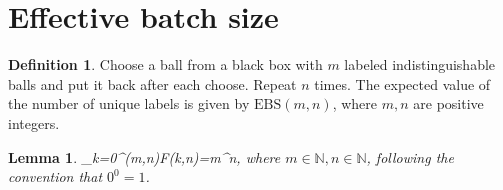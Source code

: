 \documentclass[12pt, letterpaper]{article}
\newcommand{\nat}{\mathbb{N}}
\newcommand{\inte}{\mathbb{Z}}
\newcommand{\red}[1]{{\color{red} #1}}
\newenvironment{eqlong}{\equation\aligned}{\endaligned\endequation}
\newtheorem{prop}{Proposition}[section]
\newtheorem{lem}[prop]{Lemma}
\newtheorem{cor}[prop]{Corollary}
\theoremstyle{definition}
\newtheorem*{def*}{Definition}
\theoremstyle{remark}
\newcommand{\EBS}{\mathrm{EBS}}
\begin{document}
%
%	
%
%
%		

	\section{Effective batch size}
	
	\begin{def*}
		Choose a ball from a black box with $m$ labeled indistinguishable balls and put it back after each choose.
		Repeat $n$ times. The expected value of the number of unique labels is given by	
			$\EBS(m,n)$,
		where $m, n$ are positive integers.
	\end{def*}

	\begin{lem}
		\begin{eqlong}
			\sum_{k=0}^{\min(m,n)}F(k,n)=m^n,
		\end{eqlong}
		where $m\in\nat, n\in\nat$, following the convention that $0^0=1$.
	\end{lem}
\end{document}
